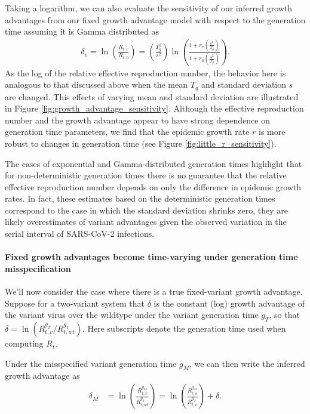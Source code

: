 \documentclass[11pt,oneside,letterpaper]{article}
\begin{document}
Taking a logarithm, we can also evaluate the sensitivity of our inferred growth advantages from our fixed growth advantage model with respect to the generation time assuming it is Gamma distributed as
\begin{align*}
 \delta_{v}  = \ln \left( \frac{R_{t,v}}{R_{t,0}} \right) = \left( \frac{T_{g}^{2}}{s^{2}} \right)  \ln \left( \frac{1 + r_{v}  \left(\frac{s^{2}}{T_{g}}\right)}{1 + r_{0} \left(\frac{s^{2}}{T_{g}}\right) } \right).
\end{align*}
As the log of the relative effective reproduction number, the behavior here is analogous to that discussed above when the mean $T_{g}$ and standard deviation $s$ are changed.
This effects of varying mean and standard deviation are illustrated in Figure \ref{fig:growth_advantage_sensitivity}.
Although the effective reproduction number and the growth advantage appear to have strong dependence on generation time parameters, we find that the epidemic growth rate $r$ is more robust to changes in generation time (see Figure \ref{fig:little_r_sensitivity}).

The cases of exponential and Gamma-distributed generation times highlight that for non-deterministic generation times there is no guarantee that the relative effective reproduction number depends on only the difference in epidemic growth rates.
In fact, these estimates based on the deterministic generation times correspond to the case in which the standard deviation shrinks zero, they are likely overestimates of variant advantages given the observed variation in the serial interval of SARS-CoV-2 infections.

\paragraph{Fixed growth advantages become time-varying under generation time misspecification}

We'll now consider the case where there is a true fixed-variant growth advantage. Suppose for a two-variant system that $\delta$ is the constant (log) growth advantage of the variant virus over the wildtype under the variant generation time $g_{T}$, so that $\delta = \ln \left( R_{t,v}^{g_{T}} / R_{t, wt}^{g_{T}} \right)$.
Here subscripts denote the generation time used when computing $R_{t}$.

Under the misspecified variant generation time $g_{M}$, we can then write the inferred growth advantage as
\begin{align*}
  \delta_{M} &= \ln \left( \frac{R_{t,v}^{g_{M}}}{R_{t, wt}^{g_{T}}} \right) = \ln \left(\frac{R_{t,v}^{g_{M}}}{R_{t,v}^{g_{T}}}\right) + \delta.
\end{align*}
\end{document}
